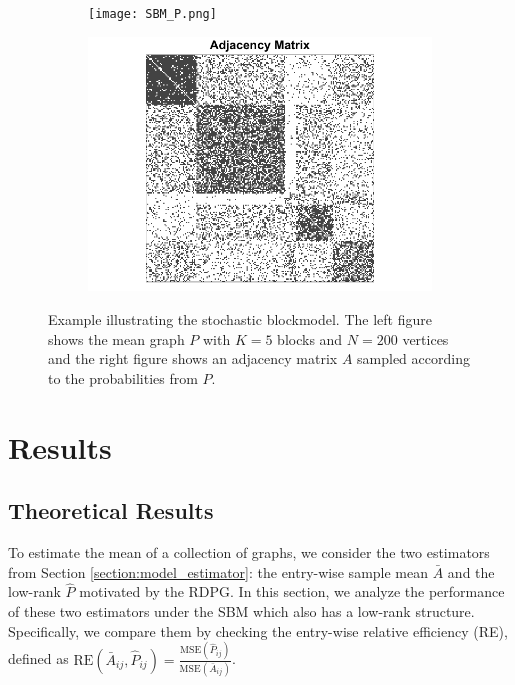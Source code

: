 \documentclass[a4paper]{article}
\begin{document}
\begin{figure}
\centering
\begin{subfigure}{.5\textwidth}
  \centering
  \texttt{[image: SBM\_P.png]}
\end{subfigure}%
\begin{subfigure}{.5\textwidth}
  \centering
  \includegraphics[width=1.2\linewidth]{SBM_A.png}
\end{subfigure}
\caption{Example illustrating the stochastic blockmodel. The left figure shows the mean graph $P$ with $K = 5$ blocks and $N=200$ vertices and the right figure shows an adjacency matrix $A$ sampled according to the probabilities from $P$.}
\label{fig:SBM_example}
\end{figure}



\section{Results}

\subsection{Theoretical Results}
\label{section:theoretical_result}
To estimate the mean of a collection of graphs, we consider the two estimators from Section \ref{section:model_estimator}: the entry-wise sample mean $\bar{A}$ and the low-rank $\hat{P}$ motivated by the RDPG.
In this section, we analyze the performance of these two estimators under the SBM which also has a low-rank structure. 
Specifically, we compare them by checking the entry-wise relative efficiency (RE), defined as $\mathrm{RE}(\bar{A}_{ij}, \hat{P}_{ij}) = \frac{\mathrm{MSE}(\hat{P}_{ij})}{\mathrm{MSE}(\bar{A}_{ij})}$.
\end{document}
